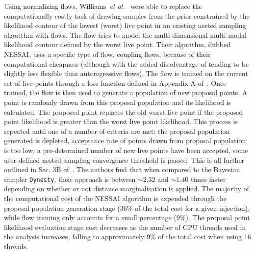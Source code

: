%
%
Using normalizing flows, 
Williams~\textit{et al.}~\cite{PhysRevD.103.103006} were able to replace 
the computationally costly task of drawing samples from the prior 
constrained by the likelihood contour of the lowest (worst) 
live point in an existing 
nested sampling algorithm with flows. The flow tries to model 
the multi-dimensional multi-modal likelihood contour defined by the worst live 
point. Their algorithm, dubbed \ac{NESSAI}, uses a 
specific type of flow, coupling flows, 
because of their computational cheapness (although with the 
added disadvantage of tending to be slightly less flexible 
than autoregressive flows). The flow is trained on the current set 
of live points through a loss function defined in Appendix A
of~\cite{PhysRevD.103.103006}. Once trained, the flow is then 
used to generate a population of new proposal points. A point is randomly 
drawn from this proposal population and its likelihood is calculated. 
The proposed point replaces the old worst live point 
if the proposed point likelihood is greater than the worst 
live point likelihood. This process is repeated until one of a number of 
criteria are met: the proposal 
population generated is depleted, acceptance rate of points drawn 
from proposal population is too low, a pre-determined number of new 
live points have been accepted, some user-defined nested sampling 
convergence threshold is passed. This is all further outlined in Sec. 3B 
of~\cite{PhysRevD.103.103006}. The authors find that when compared 
to the Bayesian sampler \texttt{Dynesty}, their approach is between 
$\sim 2.32$ and $\sim 1.40$ times faster depending on whether or 
not distance marginalisation is applied.
The majority of the computational cost of the \ac{NESSAI} algorithm is 
expended through the proposal population generation stage 
($36\%$ of the total cost for a given injection), while flow 
training only accounts for a small percentage ($9\%$). The proposal point
likelihood evaluation stage cost decreases as the number of 
CPU threads used in the analysis 
increases, falling to approximately $9\%$ of the total cost when using 
16 threads. 

